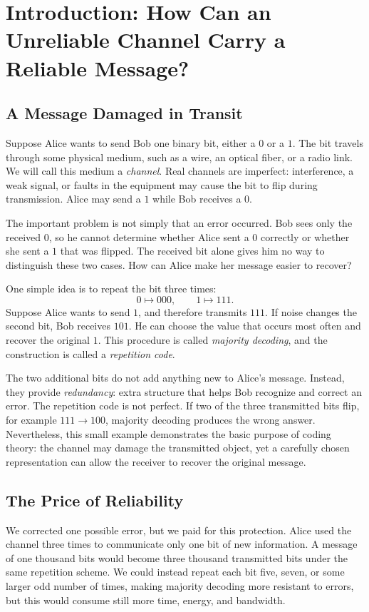 \section{Introduction: How Can an Unreliable Channel Carry a Reliable Message?}

\subsection{A Message Damaged in Transit}

Suppose Alice wants to send Bob one binary bit, either a $0$ or a $1$. The bit travels through some physical medium, such as a wire, an optical fiber, or a radio link. We will call this medium a \emph{channel}. Real channels are imperfect: interference, a weak signal, or faults in the equipment may cause the bit to flip during transmission. Alice may send a $1$ while Bob receives a $0$.

The important problem is not simply that an error occurred. Bob sees only the received $0$, so he cannot determine whether Alice sent a $0$ correctly or whether she sent a $1$ that was flipped. The received bit alone gives him no way to distinguish these two cases. How can Alice make her message easier to recover?

One simple idea is to repeat the bit three times:
\[
0\longmapsto 000,
\qquad
1\longmapsto 111.
\]
Suppose Alice wants to send $1$, and therefore transmits $111$. If noise changes the second bit, Bob receives $101$. He can choose the value that occurs most often and recover the original $1$. This procedure is called \emph{majority decoding}, and the construction is called a \emph{repetition code}.

The two additional bits do not add anything new to Alice's message. Instead, they provide \emph{redundancy}: extra structure that helps Bob recognize and correct an error. The repetition code is not perfect. If two of the three transmitted bits flip, for example $111\to100$, majority decoding produces the wrong answer. Nevertheless, this small example demonstrates the basic purpose of coding theory: the channel may damage the transmitted object, yet a carefully chosen representation can allow the receiver to recover the original message.

\subsection{The Price of Reliability}

We corrected one possible error, but we paid for this protection. Alice used the channel three times to communicate only one bit of new information. A message of one thousand bits would become three thousand transmitted bits under the same repetition scheme. We could instead repeat each bit five, seven, or some larger odd number of times, making majority decoding more resistant to errors, but this would consume still more time, energy, and bandwidth.

